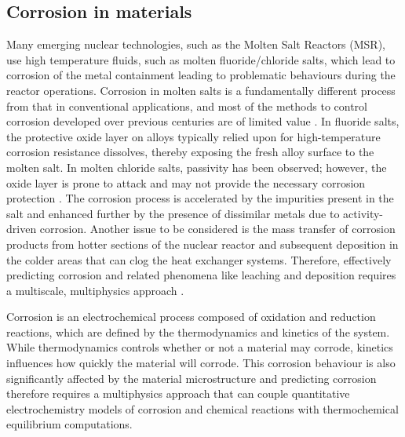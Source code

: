 	\subsection{Corrosion in materials}
	Many emerging nuclear technologies, such as the Molten Salt Reactors (MSR), use high temperature fluids, such as molten fluoride/chloride salts, which lead to corrosion of the metal containment leading to problematic behaviours during the reactor operations. Corrosion in molten salts is a fundamentally different process from that in conventional applications, and most of the methods to control corrosion developed over previous centuries are of limited value \cite{Yoshioka:2017aa}. In fluoride salts, the protective oxide layer on alloys typically relied upon for high-temperature corrosion resistance dissolves, thereby exposing the fresh alloy surface to the molten salt. In molten chloride salts, passivity has been observed; however, the oxide layer is prone to attack and may not provide the necessary corrosion protection \cite{Sridharan:2013aa}. The corrosion process is accelerated by the impurities present in the salt and enhanced further by the presence of dissimilar metals due to activity-driven corrosion. Another issue to be considered is the mass transfer of corrosion products from hotter sections of the nuclear reactor and subsequent deposition in the colder areas that can clog the heat exchanger systems. Therefore, effectively predicting corrosion and related phenomena like leaching and deposition requires a multiscale, multiphysics approach \cite{Mcmurray:2018aa}.
	
	Corrosion is an electrochemical process composed of oxidation and reduction reactions, which are defined by the thermodynamics and kinetics of the system. While thermodynamics controls whether or not a material may corrode, kinetics influences how quickly the material will corrode. This corrosion behaviour is also significantly affected by the material microstructure and predicting corrosion therefore requires a multiphysics approach that can couple quantitative electrochemistry models of corrosion and chemical reactions with thermochemical equilibrium computations.
	
